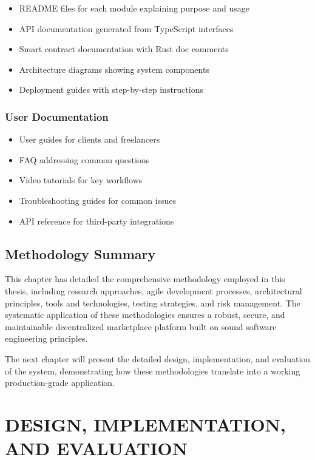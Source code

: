 \documentclass[a4paper,13pt,twoside]{report}
\theoremstyle{definition}
\begin{document}
\begin{itemize}
    \item README files for each module explaining purpose and usage
    \item API documentation generated from TypeScript interfaces
    \item Smart contract documentation with Rust doc comments
    \item Architecture diagrams showing system components
    \item Deployment guides with step-by-step instructions
\end{itemize}

\subsection{User Documentation}

\begin{itemize}
    \item User guides for clients and freelancers
    \item FAQ addressing common questions
    \item Video tutorials for key workflows
    \item Troubleshooting guides for common issues
    \item API reference for third-party integrations
\end{itemize}

\section{Methodology Summary}

This chapter has detailed the comprehensive methodology employed in this thesis, including research approaches, agile development processes, architectural principles, tools and technologies, testing strategies, and risk management. The systematic application of these methodologies ensures a robust, secure, and maintainable decentralized marketplace platform built on sound software engineering principles.

The next chapter will present the detailed design, implementation, and evaluation of the system, demonstrating how these methodologies translate into a working production-grade application.

\newpage
\chapter{DESIGN, IMPLEMENTATION, AND EVALUATION}
\label{chapter:Experiment}
\end{document}
